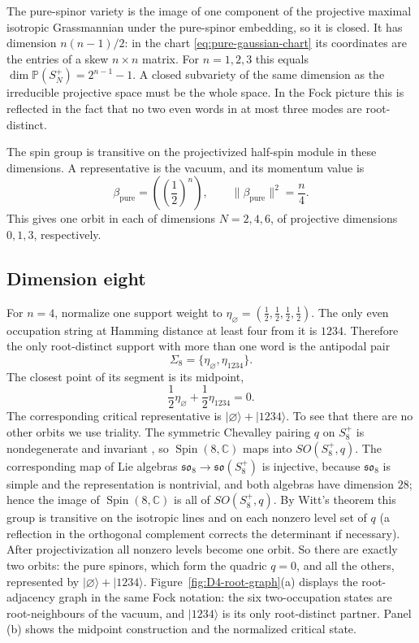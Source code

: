 \documentclass{article}
\theoremstyle{definition}
\theoremstyle{remark}
\newcommand{\C}{\mathbb C}
\newcommand{\PP}{\mathbb P}
\newcommand{\Spin}{\operatorname{Spin}}
\newcommand{\ket}[1]{\lvert #1\rangle}
\newcommand{\norm}[1]{\lVert #1\rVert}
\begin{document}
The pure-spinor variety is the image of one component of the projective
maximal isotropic Grassmannian under the pure-spinor embedding, so it
is closed. It has dimension $n(n-1)/2$: in the chart
\eqref{eq:pure-gaussian-chart} its coordinates are the entries of a skew
$n\times n$ matrix. For $n=1,2,3$ this equals
$\dim\PP(S_N^+)=2^{n-1}-1$. A closed subvariety of the same dimension
as the irreducible projective space must be the whole space. In the Fock picture this is reflected in the fact that no two even words in
at most three modes are root-distinct.

The spin group is transitive on the projectivized half-spin module in these
dimensions.  A representative is the vacuum, and its momentum value is
\[
 \beta_{\mathrm{pure}}=
 \left(\left(\frac12\right)^n\right),
 \qquad
 \norm{\beta_{\mathrm{pure}}}^2=\frac n4 .
\]
This gives one orbit in each of dimensions $N=2,4,6$, of projective
dimensions $0,1,3$, respectively.

\subsection{Dimension eight}
\label{sec:even-eight}

For $n=4$, normalize one support weight to
$\eta_\varnothing=(\frac12,\frac12,\frac12,\frac12)$.
The only even occupation string at Hamming distance at least four from it is
$1234$.  Therefore the only root-distinct support with more than one word is the antipodal
pair
\[
 \Sigma_8=\{\eta_\varnothing,\eta_{1234}\}.
\]
The closest point of its segment is its midpoint,
\begin{equation}
 \frac12\eta_\varnothing+\frac12\eta_{1234}=0.
 \label{eq:D4-antipodal-midpoint}
\end{equation}
The corresponding critical representative is
$\ket\varnothing+\ket{1234}$. To see that there are no other orbits we use triality. The symmetric
Chevalley pairing $q$ on $S_8^+$ is nondegenerate and invariant
\cite{Chevalley1954}, so $\Spin(8,\C)$ maps into $SO(S_8^+,q)$. The
corresponding map of Lie algebras $\mathfrak{so}_8\to\mathfrak{so}(S_8^+)$ is
injective, because $\mathfrak{so}_8$ is simple and the representation is
nontrivial, and both algebras have dimension $28$; hence the image of
$\Spin(8,\C)$ is all of $SO(S_8^+,q)$. By Witt's theorem this group is
transitive on the isotropic lines and on each nonzero level set of $q$ (a
reflection in the orthogonal complement corrects the determinant if
necessary). After projectivization all nonzero levels become one orbit. So
there are exactly two orbits: the pure spinors, which form the quadric $q=0$,
and all the others, represented by $\ket\varnothing+\ket{1234}$.
Figure~\ref{fig:D4-root-graph}(a) displays the
root-adjacency graph in the same Fock notation: the six two-occupation
states are root-neighbours of the vacuum, and $\ket{1234}$ is its only
root-distinct partner. Panel (b) shows the midpoint construction and the
normalized critical state.
\end{document}
